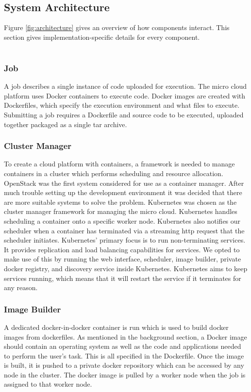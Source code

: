 \documentclass{sig-alternate-05-2015}
\begin{document}
\subsection{System Architecture}
Figure \ref{fig:architecture} gives an overview of how components interact. This section gives implementation-specific details for every component.
\\\\
\subsubsection{Job}
A job describes a single instance of code uploaded for execution. 
The micro cloud platform uses Docker containers to execute code. Docker images are created with Dockerfiles, which specify the execution environment and what files to execute. Submitting a job requires a Dockerfile and source code to be executed, uploaded together packaged as a single tar archive.  

\subsubsection{Cluster Manager}
To create a cloud platform with containers, a framework is needed to manage containers in a cluster which performs scheduling and resource allocation. OpenStack was the first system considered for use as a container manager. After much trouble setting up the development environment it was decided that there are more suitable systems to solve the problem. Kubernetes was chosen as the cluster manager framework for managing the micro cloud. Kubernetes handles scheduling a container onto a specific worker node. Kubernetes also notifies our scheduler when a container has terminated via a streaming http request that the scheduler initiates. Kubernetes' primary focus is to run non-terminating services. It provides replication and load balancing capabilities for services. We opted to make use of this by running the web interface, scheduler, image builder, private docker registry, and discovery service inside Kubernetes. Kubernetes aims to keep services running, which means that it will restart the service if it terminates for any reason.

\subsubsection{Image Builder}
A dedicated docker-in-docker container is run which is used to build docker images from dockerfiles. As mentioned in the background section, a Docker image should contain an operating system as well as the code and applications needed to perform the user's task. This is all specified in the Dockerfile. Once the image is built, it is pushed to a private docker repository which can be accessed by any node in the cluster. The docker image is pulled by a worker node when the job is assigned to that worker node.
\end{document}
